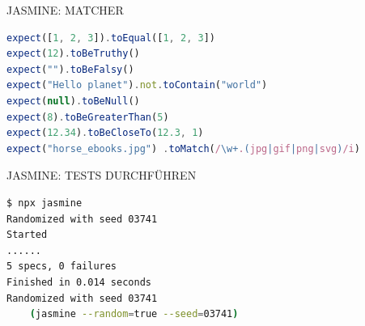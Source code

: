 \begin{code}{JASMINE: MATCHER}
\begin{lstlisting}[language=JavaScript, style=basesmol]
expect([1, 2, 3]).toEqual([1, 2, 3])
expect(12).toBeTruthy()
expect("").toBeFalsy()
expect("Hello planet").not.toContain("world")
expect(null).toBeNull()
expect(8).toBeGreaterThan(5)
expect(12.34).toBeCloseTo(12.3, 1)
expect("horse_ebooks.jpg") .toMatch(/\w+.(jpg|gif|png|svg)/i)
\end{lstlisting}
\end{code}

\begin{KR}{JASMINE: TESTS DURCHFÜHREN}
\begin{lstlisting}[language=bash, style=basesmol]
$ npx jasmine
Randomized with seed 03741
Started
......
5 specs, 0 failures
Finished in 0.014 seconds
Randomized with seed 03741 
    (jasmine --random=true --seed=03741)
\end{lstlisting}
\end{KR}

